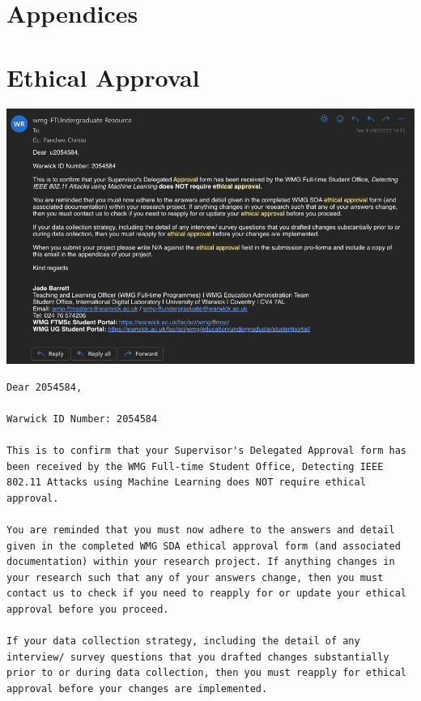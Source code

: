\begin{appendices}

\section*{Appendices}

\section{Ethical Approval}
\label{appx:Ethical Approval}

\begin{center}
	\includegraphics[width=\textwidth]{Appendices/Images/ethical_approval.png}
\end{center}

\begin{lstlisting}[language={}]
Dear 2054584,

Warwick ID Number: 2054584 

This is to confirm that your Supervisor's Delegated Approval form has been received by the WMG Full-time Student Office, Detecting IEEE 802.11 Attacks using Machine Learning does NOT require ethical approval.

You are reminded that you must now adhere to the answers and detail given in the completed WMG SDA ethical approval form (and associated documentation) within your research project. If anything changes in your research such that any of your answers change, then you must contact us to check if you need to reapply for or update your ethical approval before you proceed.

If your data collection strategy, including the detail of any interview/ survey questions that you drafted changes substantially prior to or during data collection, then you must reapply for ethical approval before your changes are implemented. 


\end{lstlisting}
\end{appendices}
